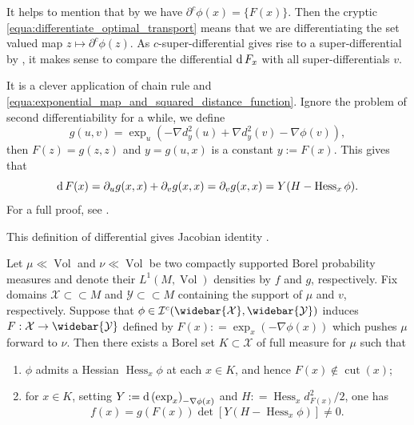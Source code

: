 It helps to mention that by  we have
$\partial^c \phi (x) = \{ F(x) \}$.
Then the cryptic \cref{equa:differentiate_optimal_transport} means that we are differentiating
the set valued map $z \mapsto \partial^c \phi(z)$.
As $c$-super-differential gives rise to a super-differential by ,
it makes sense to compare the differential $\operatorname{d} F_x$ with all super-differentials $v$.
\begin{rmk}

	It is a clever application of chain rule and \cref{equa:exponential_map_and_squared_distance_function}.
	Ignore the problem of second differentiability for a while, we define
	\[
		g(u,v) = \exp_{u}(-\nabla d_y^2(u) + \nabla d_y^2(v) - \nabla \phi (v)),
	\]
	then $F(z) = g(z, z)$ and $ y = g(u, x) $ is a constant $y := F(x)$.
	This gives that
	\[
		\operatorname{d} F(x) = \partial_u g(x, x) + \partial_v g(x, x) = \partial_v g(x, x) = Y(H - \operatorname{Hess}_x \phi).
	\]
	For a full proof, see \cite[Proposition 4.1]{cordero2001riemannian}.
\end{rmk}

This definition of differential gives Jacobian identity \cite[Theorem 4.2]{cordero2001riemannian}.

\begin{thm}
	\label{thm:jacobian_identity}
	Let \( \mu \ll \operatorname{Vol} \) and \( \nu \ll \operatorname{Vol} \) be
	two compactly supported Borel probability measures and denote their
	\( L ^ { 1 } ( M, \operatorname{Vol}) \) densities by \( f \) and \( g \), respectively.
	Fix domains \( \mathcal{X} \subset \subset M \) and \( \mathcal{Y} \subset \subset M \) containing the support of \( \mu \) and \( v \), respectively.
	Suppose that \( \phi \in \mathcal{I} ^ { c } ( \widebar { \mathcal{X} } , \widebar { \mathcal{Y} } ) \) induces
	\( F : \mathcal{X} \rightarrow \widebar { \mathcal{Y} } \) defined by \( F ( x ) : = \exp _ { x } ( - \nabla \phi ( x ) ) \)
	which pushes \( \mu \) forward to $\nu$.
	Then there exists a Borel set \( K \subset \mathcal{X} \) of full
	measure for \( \mu \) such that
	\begin{enumerate}
		\item $\phi$ admits a Hessian \( \operatorname { Hess } _ { x } \phi \) at each \( x \in K \), and hence \( F ( x ) \notin \operatorname { cut } ( x ) \);
		\item for \( x \in K \), setting \( Y : = \operatorname{d} \left( \exp _ { x } \right) _ { - \nabla \phi ( x ) } \) and \( H : = \operatorname { Hess } _ { x } d _ { F ( x ) } ^ { 2 } / 2 \), one
		      has
		      \[ f ( x ) = g ( F ( x ) ) \operatorname { det } \left[ Y \left( H - \operatorname { Hess } _ { x } \phi \right) \right] \neq 0 .\]
	\end{enumerate}
\end{thm}

